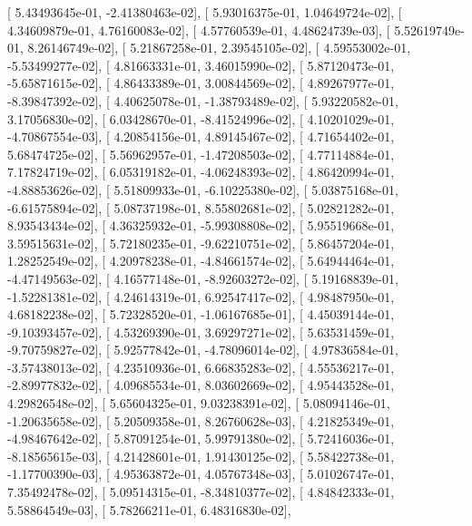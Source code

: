 \documentclass{article}
\begin{document}
       [  5.43493645e-01,  -2.41380463e-02],
       [  5.93016375e-01,   1.04649724e-02],
       [  4.34609879e-01,   4.76160083e-02],
       [  4.57760539e-01,   4.48624739e-03],
       [  5.52619749e-01,   8.26146749e-02],
       [  5.21867258e-01,   2.39545105e-02],
       [  4.59553002e-01,  -5.53499277e-02],
       [  4.81663331e-01,   3.46015990e-02],
       [  5.87120473e-01,  -5.65871615e-02],
       [  4.86433389e-01,   3.00844569e-02],
       [  4.89267977e-01,  -8.39847392e-02],
       [  4.40625078e-01,  -1.38793489e-02],
       [  5.93220582e-01,   3.17056830e-02],
       [  6.03428670e-01,  -8.41524996e-02],
       [  4.10201029e-01,  -4.70867554e-03],
       [  4.20854156e-01,   4.89145467e-02],
       [  4.71654402e-01,   5.68474725e-02],
       [  5.56962957e-01,  -1.47208503e-02],
       [  4.77114884e-01,   7.17824719e-02],
       [  6.05319182e-01,  -4.06248393e-02],
       [  4.86420994e-01,  -4.88853626e-02],
       [  5.51809933e-01,  -6.10225380e-02],
       [  5.03875168e-01,  -6.61575894e-02],
       [  5.08737198e-01,   8.55802681e-02],
       [  5.02821282e-01,   8.93543434e-02],
       [  4.36325932e-01,  -5.99308808e-02],
       [  5.95519668e-01,   3.59515631e-02],
       [  5.72180235e-01,  -9.62210751e-02],
       [  5.86457204e-01,   1.28252549e-02],
       [  4.20978238e-01,  -4.84661574e-02],
       [  5.64944464e-01,  -4.47149563e-02],
       [  4.16577148e-01,  -8.92603272e-02],
       [  5.19168839e-01,  -1.52281381e-02],
       [  4.24614319e-01,   6.92547417e-02],
       [  4.98487950e-01,   4.68182238e-02],
       [  5.72328520e-01,  -1.06167685e-01],
       [  4.45039144e-01,  -9.10393457e-02],
       [  4.53269390e-01,   3.69297271e-02],
       [  5.63531459e-01,  -9.70759827e-02],
       [  5.92577842e-01,  -4.78096014e-02],
       [  4.97836584e-01,  -3.57438013e-02],
       [  4.23510936e-01,   6.66835283e-02],
       [  4.55536217e-01,  -2.89977832e-02],
       [  4.09685534e-01,   8.03602669e-02],
       [  4.95443528e-01,   4.29826548e-02],
       [  5.65604325e-01,   9.03238391e-02],
       [  5.08094146e-01,  -1.20635658e-02],
       [  5.20509358e-01,   8.26760628e-03],
       [  4.21825349e-01,  -4.98467642e-02],
       [  5.87091254e-01,   5.99791380e-02],
       [  5.72416036e-01,  -8.18565615e-03],
       [  4.21428601e-01,   1.91430125e-02],
       [  5.58422738e-01,  -1.17700390e-03],
       [  4.95363872e-01,   4.05767348e-03],
       [  5.01026747e-01,   7.35492478e-02],
       [  5.09514315e-01,  -8.34810377e-02],
       [  4.84842333e-01,   5.58864549e-03],
       [  5.78266211e-01,   6.48316830e-02],
\end{document}
